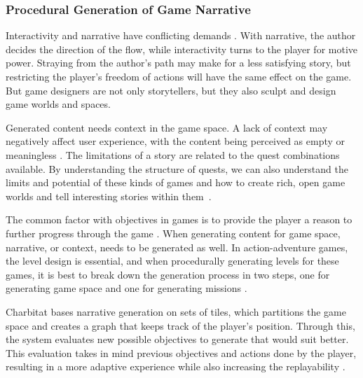 \subsubsection{Procedural Generation of Game Narrative}
Interactivity and narrative have conflicting demands . With narrative, the author decides the direction of the flow, while interactivity turns to the player for motive power. Straying from the author's path may make for a less satisfying story, but restricting the player's freedom of actions will have the same effect on the game. But game designers are not only storytellers, but they also sculpt and design game worlds and spaces.

Generated content needs context in the game space. A lack of context may negatively affect user experience, with the content being perceived as empty or meaningless . The limitations of a story are related to the quest combinations available. By understanding the structure of quests, we can also understand the limits and potential of these kinds of games and how to create rich, open game worlds and tell interesting stories within them~.

The common factor with objectives in games is to provide the player a reason to further progress through the game . When generating content for game space, narrative, or context, needs to be generated as well. In action-adventure games, the level design is essential, and when procedurally generating levels for these games, it is best to break down the generation process in two steps, one for generating game space and one for generating missions .

Charbitat bases narrative generation on sets of tiles, which partitions the game space and creates a graph that keeps track of the player's position. Through this, the system evaluates new possible objectives to generate that would suit better. This evaluation takes in mind previous objectives and actions done by the player, resulting in a more adaptive experience while also increasing the replayability .

